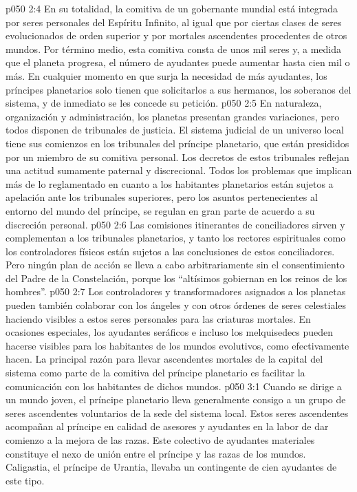 \vs p050 2:4 En su totalidad, la comitiva de un gobernante mundial está integrada por seres personales del Espíritu Infinito, al igual que por ciertas clases de seres evolucionados de orden superior y por mortales ascendentes procedentes de otros mundos. Por término medio, esta comitiva consta de unos mil seres y, a medida que el planeta progresa, el número de ayudantes puede aumentar hasta cien mil o más. En cualquier momento en que surja la necesidad de más ayudantes, los príncipes planetarios solo tienen que solicitarlos a sus hermanos, los soberanos del sistema, y de inmediato se les concede su petición.
\vs p050 2:5 En naturaleza, organización y administración, los planetas presentan grandes variaciones, pero todos disponen de tribunales de justicia. El sistema judicial de un universo local tiene sus comienzos en los tribunales del príncipe planetario, que están presididos por un miembro de su comitiva personal. Los decretos de estos tribunales reflejan una actitud sumamente paternal y discrecional. Todos los problemas que implican más de lo reglamentado en cuanto a los habitantes planetarios están sujetos a apelación ante los tribunales superiores, pero los asuntos pertenecientes al entorno del mundo del príncipe, se regulan en gran parte de acuerdo a su discreción personal.
\vs p050 2:6 Las comisiones itinerantes de conciliadores sirven y complementan a los tribunales planetarios, y tanto los rectores espirituales como los controladores físicos están sujetos a las conclusiones de estos conciliadores. Pero ningún plan de acción se lleva a cabo arbitrariamente sin el consentimiento del Padre de la Constelación, porque los “altísimos gobiernan en los reinos de los hombres”.
\vs p050 2:7 Los controladores y transformadores asignados a los planetas pueden también colaborar con los ángeles y con otros órdenes de seres celestiales haciendo visibles a estos seres personales para las criaturas mortales. En ocasiones especiales, los ayudantes seráficos e incluso los melquisedecs pueden hacerse visibles para los habitantes de los mundos evolutivos, como efectivamente hacen. La principal razón para llevar ascendentes mortales de la capital del sistema como parte de la comitiva del príncipe planetario es facilitar la comunicación con los habitantes de dichos mundos.
\vs p050 3:1 Cuando se dirige a un mundo joven, el príncipe planetario lleva generalmente consigo a un grupo de seres ascendentes voluntarios de la sede del sistema local. Estos seres ascendentes acompañan al príncipe en calidad de asesores y ayudantes en la labor de dar comienzo a la mejora de las razas. Este colectivo de ayudantes materiales constituye el nexo de unión entre el príncipe y las razas de los mundos. Caligastia, el príncipe de Urantia, llevaba un contingente de cien ayudantes de este tipo.
